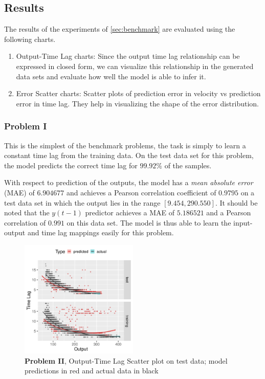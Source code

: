 \documentclass[envcountsect,runningheads]{llncs}
\theoremstyle{etoile}
\begin{document}
\subsection{Results}

The results of the experiments of \ref{sec:benchmark} are evaluated using the following charts.

\begin{enumerate}
    \item Output-Time Lag charts: Since the output time lag relationship can be expressed in closed 
          form, we can visualize this relationship in the generated data sets and evaluate how well 
          the model is able to infer it.
    \item Error Scatter charts: Scatter plots of prediction error in velocity vs prediction error 
          in time lag. They help in visualizing the shape of the error distribution.
\end{enumerate}


\subsubsection{Problem I}

This is the simplest of the benchmark problems, the task is simply to learn a constant time lag from 
the training data. On the test data set for this problem, the model predicts the correct time lag for 
$99.92\%$ of the samples. 

With respect to prediction of the outputs, the model has a \emph{mean absolute error} (MAE) of 
$6.904677$ and achieves a Pearson correlation coefficient of $0.9795$ on a test data set in which the 
output lies in the range $[9.454, 290.550]$. It should be noted that the $y(t - 1)$ predictor 
achieves a MAE of $5.186521$ and a Pearson correlation of $0.991$ on this data set. The model is 
thus able to learn the input-output and time lag mappings easily for this problem.

\begin{figure}[h]
\vspace{.3in}
\centerline{\includegraphics[width=0.5\textwidth]{figures/exp2_scatter_v_tl.png}}
\vspace{.3in}
\caption{\textbf{Problem II}, Output-Time Lag Scatter plot on test data; model predictions in red and actual data in black}
\label{fig:problem2_scatter}
\end{figure}
\end{document}
